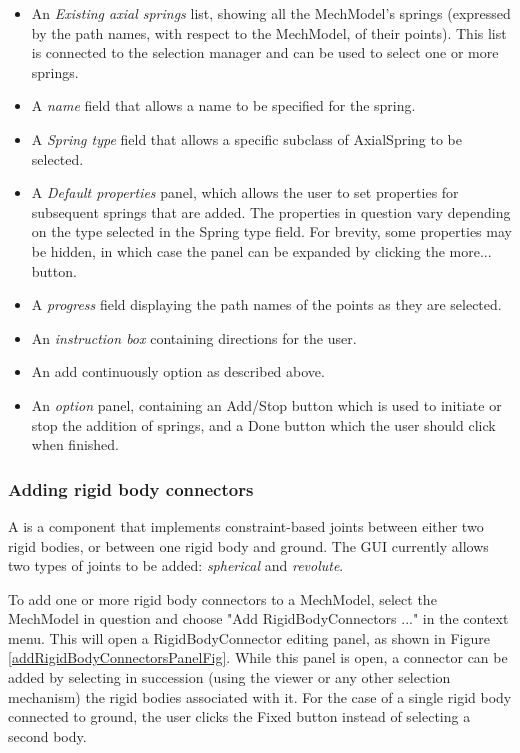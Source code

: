 \documentclass{article}
\begin{document}
\begin{itemize}

\item An {\it Existing axial springs} list, showing all the MechModel's
springs (expressed by the path names, with respect to the MechModel,
of their points). This list is connected to the selection manager and
can be used to select one or more springs.

\item A {\it name} field that allows a name to be specified for the spring.

\item A {\it Spring type} field that allows a specific subclass of AxialSpring
to be selected.

\item A {\it Default properties} panel, which allows the user to set
properties for subsequent springs that are added. The properties in
question vary depending on the type selected in the {\sf Spring type}
field. For brevity, some properties may be hidden, in which case the
panel can be expanded by clicking the {\sf more...} button.

\item A {\it progress} field displaying the path names of the points
as they are selected.

\item An {\it instruction box} containing directions for the user.

\item An {\sf add continuously} option as described above.

\item An {\it option} panel, containing an {\sf Add/Stop} button which is used
to initiate or stop the addition of springs, and a {\sf Done} button which
the user should click when finished.

\end{itemize}

\subsubsection{Adding rigid body connectors}

A  is a component
that implements constraint-based joints between either two rigid bodies, or
between one rigid body and ground. The GUI currently allows two types
of joints to be added: {\it spherical} and {\it revolute}.

To add one or more rigid body connectors to a MechModel, select the
MechModel in question and choose {\sf "Add RigidBodyConnectors ..."} in the
context menu. This will open a RigidBodyConnector editing panel, as
shown in Figure \ref{addRigidBodyConnectorsPanelFig}. While this panel is open, a
connector can be added by selecting in succession (using the viewer or
any other selection mechanism) the rigid bodies associated with
it. For the case of a single rigid body connected to ground, the user clicks 
the {\sf Fixed} button instead of selecting a second body. 
\end{document}
